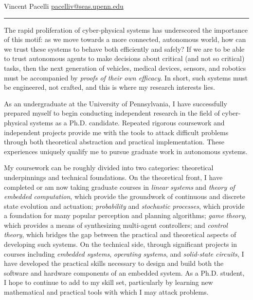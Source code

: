 \documentclass[]{letter}
\title{}
\author{}
\begin{document}
\newcommand{\comm}[1]{}

Vincent Pacelli \hfill \hfill \href{mailto:pacelliv@seas.upenn.edu}{pacelliv@seas.upenn.edu}\\
\rule{\textwidth}{0.1pt}

The rapid proliferation of cyber-physical systems has underscored the importance of this motif: as we move towards a more connected, autonomous world, how can we trust these systems to behave both efficiently and safely? If we are to be able to trust autonomous agents to make decisions about critical (and not so critical) tasks, then the next generation of vehicles, medical devices, sensors, and robotics must be accompanied by \emph{proofs of their own efficacy}. In short, such systems must be engineered, not crafted, and this is where my research interests lies.

As an undergraduate at the University of Pennsylvania, I have successfully prepared myself to begin conducting independent research in the field of cyber-physical systems as a Ph.D. candidate. Repeated rigorous coursework and independent projects provide me with the tools to attack difficult problems through both theoretical abstraction and practical implementation. These experiences uniquely qualify me to pursue graduate work in autonomous systems.


My coursework can be roughly divided into two categories: theoretical underpinnings and technical foundations.  On the theoretical front, I have completed or am now taking graduate courses in \emph{linear systems} and \emph{theory of embedded computation}, which provide the groundwork of continuous and discrete state evolution and actuation; \emph{probability} and \emph{stochastic processes}, which provide a foundation for many popular perception and planning algorithms; \emph{game theory}, which provides a means of synthesizing multi-agent controllers; and \emph{control theory}, which bridges the gap between the practical and theoretical aspects of developing such systems.  On the technical side, through significant projects in courses including \emph{embedded systems}, \emph{operating systems}, and \emph{solid-state circuits}, I have developed the practical skills necessary to design and build both the software and hardware components of an embedded system.  As a Ph.D. student, I hope to continue to add to my skill set, particularly by learning new mathematical and practical tools with which I may attack problems.
\end{document}
